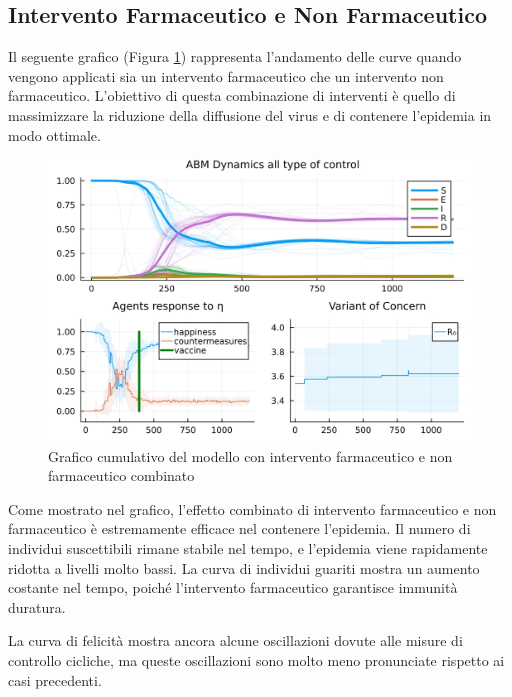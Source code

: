 \subsection{Intervento Farmaceutico e Non Farmaceutico}

Il seguente grafico (Figura \ref{fig:abm_combined_intervent}) 
rappresenta l'andamento delle curve quando vengono applicati sia 
un intervento farmaceutico che un intervento non farmaceutico. 
L'obiettivo di questa combinazione di interventi è quello di 
massimizzare la riduzione della diffusione del virus e di contenere 
l'epidemia in modo ottimale.

\begin{figure}[H]
    \begin{center}
		\includegraphics[width=\textwidth]{img/SocialNetworkABM_ALL.jpg}
		\caption{Grafico cumulativo del modello con intervento farmaceutico e non farmaceutico combinato}
		\label{fig:abm_combined_intervent}
	\end{center}
\end{figure}

Come mostrato nel grafico, l'effetto combinato di intervento 
farmaceutico e non farmaceutico è estremamente efficace nel 
contenere l'epidemia. Il numero di individui suscettibili 
rimane stabile nel tempo, e l'epidemia viene rapidamente ridotta 
a livelli molto bassi. La curva di individui guariti mostra un 
aumento costante nel tempo, poiché l'intervento farmaceutico 
garantisce immunità duratura.

La curva di felicità mostra ancora alcune oscillazioni dovute 
alle misure di controllo cicliche, ma queste oscillazioni sono 
molto meno pronunciate rispetto ai casi precedenti.

